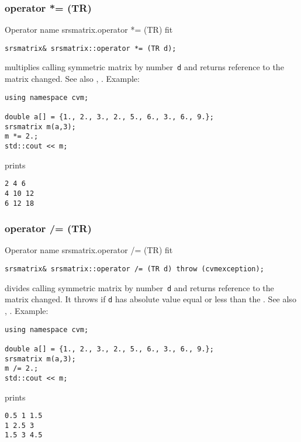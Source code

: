 \subsubsection{operator *= (TR)}
Operator%
\pdfdest name {srsmatrix.operator *= (TR)} fit
\begin{verbatim}
srsmatrix& srsmatrix::operator *= (TR d);
\end{verbatim}
multiplies  calling symmetric matrix by  number~\verb"d"
and returns  reference to
the matrix changed.
See also ,
.
Example:
\begin{Verbatim}
using namespace cvm;

double a[] = {1., 2., 3., 2., 5., 6., 3., 6., 9.};
srsmatrix m(a,3);
m *= 2.;
std::cout << m;
\end{Verbatim}
prints
\begin{Verbatim}
2 4 6
4 10 12
6 12 18
\end{Verbatim}
\newpage



\subsubsection{operator /= (TR)}
Operator%
\pdfdest name {srsmatrix.operator /= (TR)} fit
\begin{verbatim}
srsmatrix& srsmatrix::operator /= (TR d) throw (cvmexception);
\end{verbatim}
divides  calling symmetric matrix by  number~\verb"d"
and returns  reference to
the matrix changed.
It throws  
if \verb"d" has  absolute value equal or less
than the 
.
See also ,
.
Example:
\begin{Verbatim}
using namespace cvm;

double a[] = {1., 2., 3., 2., 5., 6., 3., 6., 9.};
srsmatrix m(a,3);
m /= 2.;
std::cout << m;
\end{Verbatim}
prints
\begin{Verbatim}
0.5 1 1.5
1 2.5 3
1.5 3 4.5
\end{Verbatim}
\newpage


